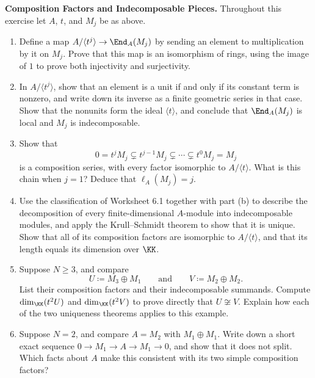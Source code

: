 \documentclass[12pt,reqno]{amsart}
\begin{document}
\begin{problems}
\item\label{c:truncated} \textbf{Composition Factors and Indecomposable Pieces.} Throughout this exercise let $A$, $t$, and $M_j$ be as above.
\begin{enumerate}
\item Define a map $A/\langle t^j\rangle\to\End_A(M_j)$ by sending an element to multiplication by it on $M_j$. Prove that this map is an isomorphism of rings, using the image of $1$ to prove both injectivity and surjectivity.
\item In $A/\langle t^j\rangle$, show that an element is a unit if and only if its constant term is nonzero, and write down its inverse as a finite geometric series in that case. Show that the nonunits form the ideal $\langle t\rangle$, and conclude that $\End_A(M_j)$ is local and $M_j$ is indecomposable.
\item Show that
\[
0=t^jM_j\subsetneq t^{j-1}M_j\subsetneq\cdots\subsetneq t^0M_j=M_j
\]
is a composition series, with every factor isomorphic to $A/\langle t\rangle$. What is this chain when $j=1$? Deduce that $\ell_A(M_j)=j$.
\item Use the classification of Worksheet 6.1 together with part (b) to describe the decomposition of every finite-dimensional $A$-module into indecomposable modules, and apply the Krull--Schmidt theorem to show that it is unique. Show that all of its composition factors are isomorphic to $A/\langle t\rangle$, and that its length equals its dimension over $\KK$.
\item Suppose $N\geq3$, and compare
\[
U\coloneqq M_3\oplus M_1\qquad\text{and}\qquad V\coloneqq M_2\oplus M_2.
\]
List their composition factors and their indecomposable summands. Compute $\dim_{\KK}(t^2U)$ and $\dim_{\KK}(t^2V)$ to prove directly that $U\not\cong V$. Explain how each of the two uniqueness theorems applies to this example.
\item Suppose $N=2$, and compare $A=M_2$ with $M_1\oplus M_1$. Write down a short exact sequence $0\to M_1\to A\to M_1\to0$, and show that it does not split. Which facts about $A$ make this consistent with its two simple composition factors?
\end{enumerate}
\end{problems}

\hrulefill
\end{document}
